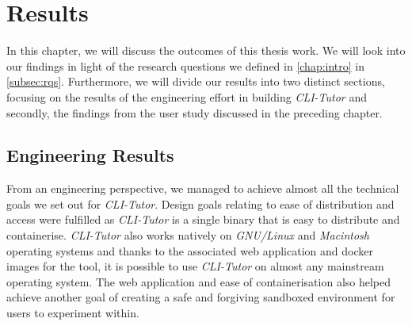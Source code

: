 \chapter{Results}
\label{chap:results}


%





In this chapter, we will discuss the outcomes of this thesis work. We will look
into our findings in light of the research questions we defined in
\autoref{chap:intro} in \autoref{subsec:rqs}. Furthermore, we will divide our
results into two distinct sections, focusing on the results of the engineering
effort in building \textit{CLI-Tutor} and secondly, the findings from the user
study discussed in the preceding chapter.


\section{Engineering Results}

From an engineering perspective, we managed to achieve almost all the
technical goals we set out for \textit{CLI-Tutor}. Design goals relating to
ease of distribution and access were fulfilled as \textit{CLI-Tutor} is a single binary that
is easy to distribute and containerise. \textit{CLI-Tutor} also works natively
on  \textit{GNU/Linux} and  \textit{Macintosh} operating systems and thanks to
the associated web application and docker images for the tool, it is possible
to use \textit{CLI-Tutor} on almost any mainstream operating system. The web
application and ease of containerisation also helped achieve another goal of
creating a safe and forgiving sandboxed environment for users to experiment
within.

